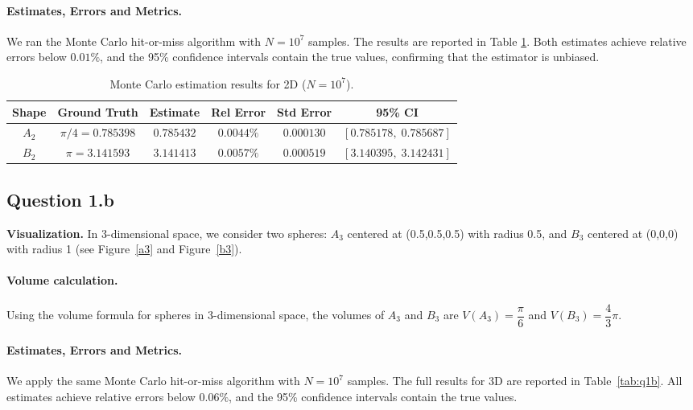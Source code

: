 \documentclass[a4paper,10pt]{article}
\theoremstyle{nonumberplain}
\theoremstyle{nonumberplain}
\theoremstyle{nonumberplain}
\theoremstyle{nonumberplain}
\begin{document}
\paragraph{Estimates, Errors and Metrics.}
We ran the Monte Carlo hit-or-miss algorithm with $N = 10^7$ samples. The results are reported in Table \ref{tab:q1a}. Both estimates achieve relative errors below $0.01\%$, and the 95\% confidence intervals contain the true values, confirming that the estimator is unbiased.

\begin{table}[hbt!]
\centering
\caption{Monte Carlo estimation results for 2D ($N = 10^7$).}
\begin{tabular}{cccccc}
\hline
\textbf{Shape} & \textbf{Ground Truth} & \textbf{Estimate} & \textbf{Rel Error} & \textbf{Std Error} & \textbf{95\% CI} \\
\hline
$A_2$ & $\pi/4 = 0.785398$ & $0.785432$ & $0.0044\%$ & $0.000130$ & $[0.785178,\; 0.785687]$ \\
$B_2$ & $\pi = 3.141593$ & $3.141413$ & $0.0057\%$ & $0.000519$ & $[3.140395,\; 3.142431]$ \\
\hline
\end{tabular}
\label{tab:q1a} 
\end{table}
\subsection{Question 1.b}
\textbf{Visualization.} In 3-dimensional space, we consider two spheres: $A_3$ centered at (0.5,0.5,0.5) with radius 0.5, and $B_3$ centered at (0,0,0) with radius 1 (see Figure~\ref{a3} and Figure~\ref{b3}).

\paragraph{Volume calculation.} Using the volume formula for spheres in 3-dimensional space, the volumes of $A_3$ and $B_3$ are $V(A_3) = \dfrac{\pi}{6}$ and  $V(B_3) = \dfrac{4}{3}\pi.$

\paragraph{Estimates, Errors and Metrics.} 
We apply the same Monte Carlo hit-or-miss algorithm with $N = 10^7$ samples. The full results for 3D are reported in Table~\ref{tab:q1b}. All estimates achieve relative errors below $0.06\%$, and the 95\% confidence intervals contain the true values.
\end{document}
